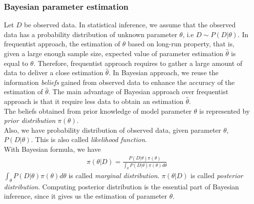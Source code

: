 \documentclass[12pt]{article}
\theoremstyle{definition}
\begin{document}
\subsubsection{Bayesian parameter estimation}
Let $D$ be observed data. In statistical inference, we assume that the observed
data has a probability distribution of unknown parameter $\theta$, i.e
$D \sim P(D|\theta)$. In frequentist approach, the estimation
of $\theta$ based on long-run property, that is, given a large enough sample
size, expected value of parameter estimation $\hat{\theta}$ is equal to
$\theta$. Therefore, frequentist approach requires to gather a large amount of
data to deliver a close estimation $\hat{\theta}$. In Bayesian approach, we
reuse the information \textit{beliefs} gained from observed data to enhance the
accuracy of the estimation of $\hat{\theta}$. The main advantage of Bayesian
approach over frequentist approach is that it require less data to obtain an
estimation $\hat{\theta}$.\\
The beliefs obtained from prior knowledge of model parameter $\theta$ is
represented by \textit{prior
  distribution} $\pi(\theta)$.\\
Also, we have probability distribution of observed data, given parameter
$\theta$, $P(D|\theta)$. This is also called \textit{likelihood function}.\\
With Bayesian formula, we have
\begin{align*}
  \pi(\theta | D) = \frac{P(D|\theta)\pi(\theta)}{\int_\theta P(D|\theta)\pi(\theta)d\theta}
\end{align*}
$\int_\theta P(D|\theta)\pi(\theta)d\theta$ is called \textit{marginal
  distribution}. $\pi(\theta | D)$ is called \textit{posterior distribution}.
Computing posterior distribution is the essential part of Bayesian inference,
since it gives us the estimation of parameter $\theta$.
\end{document}

